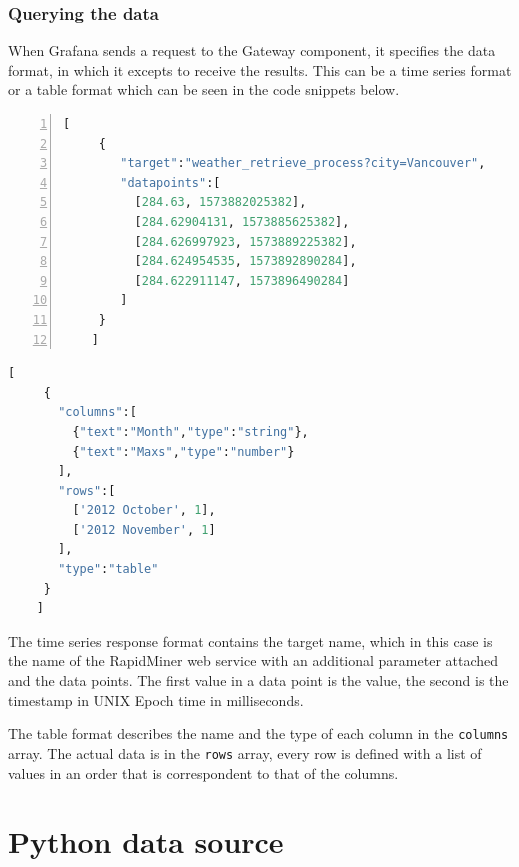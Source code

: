 \subsubsection{Querying the data}
When Grafana sends a request to the Gateway component, it specifies the data format, in which it excepts to receive the results. This can be a time series format or a table format which can be seen in the code snippets below.

\begin{minipage}[b]{0.45\linewidth}
	\centering
	\begin{lstlisting}[language=Python, frame=single, numbers=left, mathescape,%
	caption={Time series format}, label=lst:timeseries-format]
	[
	 {
	    "target":"weather_retrieve_process?city=Vancouver",
	    "datapoints":[
	      [284.63, 1573882025382],
	      [284.62904131, 1573885625382],
	      [284.626997923, 1573889225382],
	      [284.624954535, 1573892890284],
	      [284.622911147, 1573896490284]
	    ]
	 }
	]
	\end{lstlisting}
\end{minipage}
\hspace{0.5cm}
\begin{minipage}[b]{0.45\linewidth}
	\centering
	\begin{lstlisting}[language=Python, frame=single, mathescape,%
	caption={Table format}, label=lst:table-format]
	[
	 {
	   "columns":[
	     {"text":"Month","type":"string"},
	     {"text":"Maxs","type":"number"}
	   ],
	   "rows":[
	     ['2012 October', 1],
	     ['2012 November', 1]
	   ],
	   "type":"table"
	 }
	]
	\end{lstlisting}
\end{minipage}

The time series response format contains the target name, which in this case is the name of the RapidMiner web service with an additional parameter attached and the data points. The first value in a data point is the value, the second is the timestamp in UNIX Epoch time in milliseconds.

The table format describes the name and the type of each column in the \texttt{columns} array. The actual data is in the \texttt{rows} array, every row is defined with a list of values in an order that is correspondent to that of the columns.

\section{Python data source}


